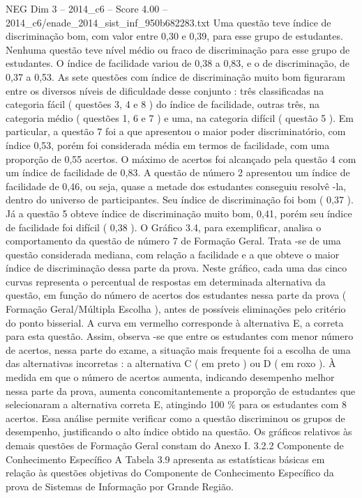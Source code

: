 \begin{textsample}{NEG Dim 3 – 2014\_c6 – Score 4.00 – 2014\_c6/enade\_2014\_sist\_inf\_950b682283.txt}
Uma questão teve índice de discriminação bom, com valor entre 0,30 e 0,39, para esse grupo de estudantes.
Nenhuma questão teve nível médio ou fraco de discriminação para esse grupo de estudantes.
O índice de facilidade variou de 0,38 a 0,83, e o de discriminação, de 0,37 a 0,53.
As sete questões com índice de discriminação muito bom figuraram entre os diversos níveis de dificuldade desse conjunto : três classificadas na categoria fácil ( questões 3, 4 e 8 ) do índice de facilidade, outras três, na categoria médio ( questões 1, 6 e 7 ) e uma, na categoria difícil ( questão 5 ).
Em particular, a questão 7 foi a que apresentou o maior poder discriminatório, com índice 0,53, porém foi considerada média em termos de facilidade, com uma proporção de 0,55 acertos.
O máximo de acertos foi alcançado pela questão 4 com um índice de facilidade de 0,83.
A questão de número 2 apresentou um índice de facilidade de 0,46, ou seja, quase a metade dos estudantes conseguiu resolvê -la, dentro do universo de participantes.
Seu índice de discriminação foi bom ( 0,37 ).
Já a questão 5 obteve índice de discriminação muito bom, 0,41, porém seu índice de facilidade foi difícil ( 0,38 ).
O Gráfico 3.4, para exemplificar, analisa o comportamento da questão de número 7 de Formação Geral.
Trata -se de uma questão considerada mediana, com relação a facilidade e a que obteve o maior índice de discriminação dessa parte da prova.
Neste gráfico, cada uma das cinco curvas representa o percentual de respostas em determinada alternativa da questão, em função do número de acertos dos estudantes nessa parte da prova ( Formação Geral/Múltipla Escolha ), antes de possíveis eliminações pelo critério do ponto bisserial.
A curva em vermelho corresponde à alternativa E, a correta para esta questão.
Assim, observa -se que entre os estudantes com menor número de acertos, nessa parte do exame, a situação mais frequente foi a escolha de uma das alternativas incorretas : a alternativa C ( em preto ) ou D ( em roxo ).
À medida em que o número de acertos aumenta, indicando desempenho melhor nessa parte da prova, aumenta concomitantemente a proporção de estudantes que selecionaram a alternativa correta E, atingindo 100 \% para os estudantes com 8 acertos.
Essa análise permite verificar como a questão discriminou os grupos de desempenho, justificando o alto índice obtido na questão.
Os gráficos relativos às demais questões de Formação Geral constam do Anexo I. 3.2.2 Componente de Conhecimento Específico A Tabela 3.9 apresenta as estatísticas básicas em relação às questões objetivas do Componente de Conhecimento Específico da prova de Sistemas de Informação por Grande Região.

\end{textsample}
